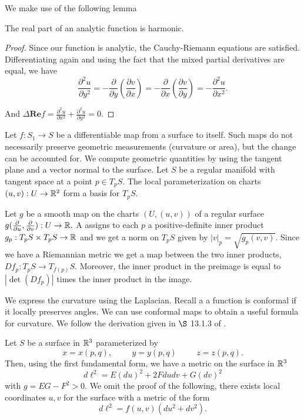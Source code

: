 We make use of the following lemma
\begin{lemma}\label{lem:anal-harmonic}
	The real part of an analytic function is harmonic.
\end{lemma}
\begin{proof}
	Since our function is analytic, the Cauchy-Riemann equations are satisfied.
	Differentiating again and using the fact that the mixed partial derivatives are equal,
	we have
	$$\frac{\partial^2 u}{\partial y^2}=-\frac{\partial}{\partial y}\left(\frac{\partial v}{\partial x}\right)
	=-\frac{\partial}{\partial x}\left(\frac{\partial v}{\partial y}\right)=-\frac{\partial^2 u}{\partial x^2}.$$

	And $\Delta \textbf{Re}f=\frac{\partial^2 u}{\partial x^2}+\frac{\partial^2 u}{\partial y^2}=0$.
\end{proof}



Let $f:S_1\to S$ be a differentiable map from a surface to itself.
Such maps do not necessarily preserve geometric measurements (curvature or area), but the change
can be accounted for. We compute geometric quantities by using the tangent plane and
a vector normal to the surface.
Let $S$ be a regular manifold with tangent space at a point $p\in T_pS.$
The local parameterization on charts $(u,v):U\to \mathbb{R}^2$ form a basis for
$T_pS$.

Let $g$ be a smooth map on the charts $(U, (u,v))$ of a regular surface
$g(\frac{\partial}{\partial u},\frac{\partial}{\partial v}):U\to \mathbb{R}.$
A  assigns to each $p$ a positive-definite inner product
$g_p:T_pS\times T_pS \to \mathbb{R}$ and we get a norm on $T_pS$ given by
$|v|_p=\sqrt{g_p(v,v)}$.
Since we have a Riemannian metric we get a map between the two inner products,
$Df_p:T_pS\to T_{f(p)}S$. Moreover, the inner product in the preimage is equal
to $|\det(Df_p)|$ times the inner product in the image.


We express the curvature using the Laplacian.
Recall a a function is conformal if it locally preserves angles.
We can use conformal maps to obtain a useful formula for curvature.
We follow the derivation given in $\S$ 13.1.3 of \cite{dubrovin_modern_1984}.

Let $S$ be a surface in $\mathbb{R}^3$ parameterized by
$$x=x(p,q), \hspace{1cm}  y=y(p,q)  \hspace{1cm} z=z(p,q).$$
Then, using the  first fundamental form, we have a metric on the surface in $\mathbb{R}^3$
$$d\ell^2=E(du)^2+2Fdudv + G(dv)^2$$
with $g=EG-F^2>0.$ 
We omit the proof of the following, there exists local coordinates $u,v$ for the surface with a metric of the form
$$d\ell^2=f(u,v)(du^2+dv^2).$$ 

